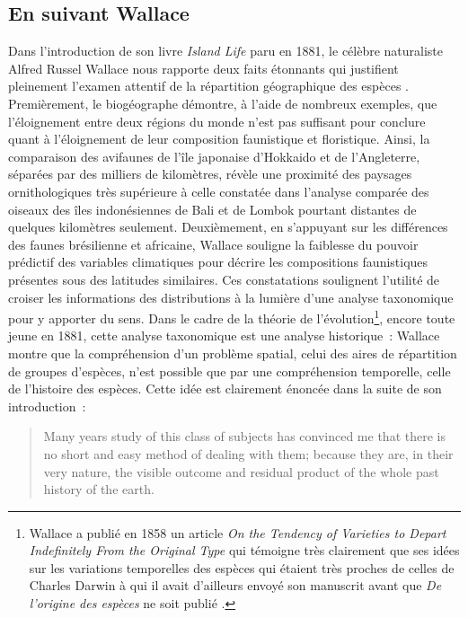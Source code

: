 \subsection*{En suivant Wallace}\label{en-suivant-wallace}

Dans l'introduction de son livre \emph{Island Life} paru en 1881, le
célèbre naturaliste Alfred Russel Wallace nous rapporte deux faits
étonnants qui justifient pleinement l'examen attentif de la répartition
géographique des espèces \citep{wallace1881island}. Premièrement, le
biogéographe démontre, à l'aide de nombreux exemples, que l'éloignement
entre deux régions du monde n'est pas suffisant pour conclure quant à
l'éloignement de leur composition faunistique et floristique. Ainsi, la
comparaison des avifaunes de l'île japonaise d'Hokkaido et de
l'Angleterre, séparées par des milliers de kilomètres, révèle une
proximité des paysages ornithologiques très supérieure à celle constatée
dans l'analyse comparée des oiseaux des îles indonésiennes de Bali et de
Lombok pourtant distantes de quelques kilomètres seulement.
Deuxièmement, en s'appuyant sur les différences des faunes brésilienne
et africaine, Wallace souligne la faiblesse du pouvoir prédictif des
variables climatiques pour décrire les compositions faunistiques
présentes sous des latitudes similaires. Ces constatations soulignent
l'utilité de croiser les informations des distributions à la lumière
d'une analyse taxonomique pour y apporter du sens. Dans le cadre de la
théorie de l'évolution\footnote{Wallace a publié en 1858 un article
  \emph{On the Tendency of Varieties to Depart Indefinitely From the
  Original Type} qui témoigne très clairement que ses idées sur les
  variations temporelles des espèces qui étaient très proches de celles
  de Charles Darwin à qui il avait d'ailleurs envoyé son manuscrit avant
  que \emph{De l'origine des espèces} ne soit publié
  \citep{Wallace1858}.}, encore toute jeune en 1881, cette analyse
taxonomique est une analyse historique~: Wallace montre que la
compréhension d'un problème spatial, celui des aires de répartition de
groupes d'espèces, n'est possible que par une compréhension temporelle,
celle de l'histoire des espèces. Cette idée est clairement énoncée dans
la suite de son introduction~:

\begin{quote}
Many years study of this class of subjects has convinced me that there
is no short and easy method of dealing with them; because they are, in
their very nature, the visible outcome and residual product of the whole
past history of the earth.
\end{quote}


